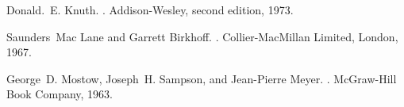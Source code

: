 \begin{thebibliography}{1}

Donald.~E. Knuth.
.
\newblock Addison-Wesley, second edition, 1973.

Saunders~Mac Lane and Garrett Birkhoff.
.
\newblock Collier-MacMillan Limited, London, 1967.

George~D. Mostow, Joseph~H. Sampson, and Jean-Pierre Meyer.
.
\newblock McGraw-Hill Book Company, 1963.

\end{thebibliography}
